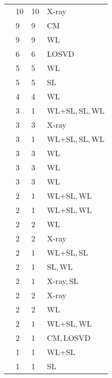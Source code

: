 \begin{center}
\begin{longtable}{|l|l|l|l|}
{\footnotesize \citet{AL03.1}} & 10 & 10 & {\small X-ray} \\
{\footnotesize \citet{RI03.1}} & 9 & 9 & {\small CM} \\
{\footnotesize \citet{OK08.1}} & 9 & 9 & {\small WL} \\
{\footnotesize \citet{LO06.1}} & 6 & 6 & {\small LOSVD} \\
{\footnotesize \citet{UM11.1}} & 5 & 5 & {\small WL} \\
{\footnotesize \citet{CO07.1}} & 5 & 5 & {\small SL} \\
{\footnotesize \citet{UM09.1}} & 4 & 4 & {\small WL} \\
{\footnotesize \citet{UM15.1}} & 3 & 1 & {\small WL+SL},\,{\small SL},\,{\small WL} \\
{\footnotesize \citet{PR05.1}} & 3 & 3 & {\small X-ray} \\
{\footnotesize \citet{HA06.1}} & 3 & 1 & {\small WL+SL},\,{\small SL},\,{\small WL} \\
{\footnotesize \citet{CO09.1}} & 3 & 3 & {\small WL} \\
{\footnotesize \citet{CL03.1}} & 3 & 3 & {\small WL} \\
{\footnotesize \citet{CL01.1}} & 3 & 3 & {\small WL} \\
{\footnotesize \citet{ZI10.1}} & 2 & 1 & {\small WL+SL},\,{\small WL} \\
{\footnotesize \citet{UM08.1}} & 2 & 1 & {\small WL+SL},\,{\small WL} \\
{\footnotesize \citet{OK15.1}} & 2 & 2 & {\small WL} \\
{\footnotesize \citet{MA99.1}} & 2 & 2 & {\small X-ray} \\
{\footnotesize \citet{GA05.2}} & 2 & 1 & {\small WL+SL},\,{\small SL} \\
{\footnotesize \citet{GA03.1}} & 2 & 1 & {\small SL},\,{\small WL} \\
{\footnotesize \citet{DO09.1}} & 2 & 1 & {\small X-ray},\,{\small SL} \\
{\footnotesize \citet{DE10.1}} & 2 & 2 & {\small X-ray} \\
{\footnotesize \citet{CL02.1}} & 2 & 2 & {\small WL} \\
{\footnotesize \citet{BU11.1}} & 2 & 1 & {\small WL+SL},\,{\small WL} \\
{\footnotesize \citet{BI13.1}} & 2 & 1 & {\small CM},\,{\small LOSVD} \\
{\footnotesize \citet{ZI11.1}} & 1 & 1 & {\small WL+SL} \\
{\footnotesize \citet{ZE06.1}} & 1 & 1 & {\small SL} \\

\end{longtable}
\end{center}
